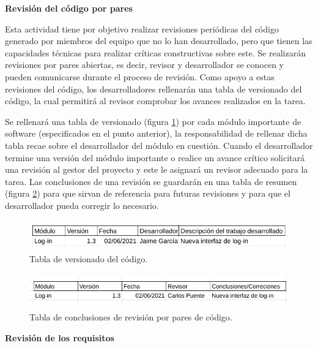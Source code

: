 \documentclass{article}
\begin{document}
\textbf{Revisión del código por pares}

Esta actividad tiene por objetivo realizar revisiones periódicas del código generado por miembros del equipo que no lo han desarrollado, pero que tienen las capacidades técnicas para realizar críticas constructivas sobre este. Se realizarán revisiones por pares abiertas, es decir, revisor y desarrollador se conocen y pueden comunicarse durante el proceso de revisión. Como apoyo a estas revisiones del código, los desarrolladores rellenarán una tabla de versionado del código, la cual permitirá al revisor comprobar los avances realizados en la tarea. 

Se rellenará una tabla de versionado (figura \ref{tablaVersionado}) por cada módulo importante de software (especificados en el punto anterior), la responsabilidad de rellenar dicha tabla recae sobre el desarrollador del módulo en cuestión. Cuando el desarrollador termine una versión del módulo importante o realice un avance crítico solicitará una revisión al gestor del proyecto y este le asignará un revisor adecuado para la tarea. Las conclusiones de una revisión se guardarán en una tabla de resumen (figura \ref{tablaConclusionesPares}) para que sirvan de referencia para futuras revisiones y para que el desarrollador pueda corregir lo necesario.

\begin{figure}[H]
    \centering
        \includegraphics[height=1.3cm]{../images/tabla_versionado_code.png}
    \caption{Tabla de versionado del código.}
    \label{tablaVersionado}
\end{figure}

\begin{figure}[H]
    \centering
        \includegraphics[height=1.5cm]{../images/tabla_conclusiones_revision_pares.png}
    \caption{Tabla de conclusiones de revisión por pares de código.}
    \label{tablaConclusionesPares}
\end{figure}

\textbf{Revisión de los requisitos}
\end{document}
